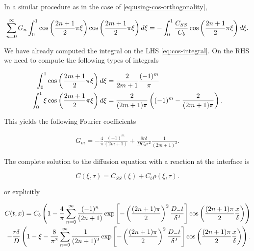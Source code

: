 In a similar procedure as in the case of \ref{eq:using-cos-orthogonality},

\begin{align}
	\sum_{n=0}^{\infty} G_n \int_{0}^{1}\cos\left({\frac{2n+1}{2}\pi\xi}\right)\cos\left({\frac{2m+1}{2}\pi\xi}\right) d\xi = -\int_0^1 \frac{C_{SS}}{C_b}\cos\left({\frac{2n+1}{2}\pi\xi}\right) d\xi.
\end{align}

We have already computed the integral on the LHS \ref{eq:cos-integral}. On the RHS we need to compute the following types of integrals

\begin{align}
	\int_0^1 \cos\left({\frac{2m+1}{2}\pi\xi}\right) d\xi &= \frac{2}{2m+1} \frac{(-1)^m}{\pi}\\
	\int_0^1 \xi \cos\left({\frac{2m+1}{2}\pi\xi}\right) d\xi &= \frac{2}{(2m+1)\pi} \left({(-1)^m -\frac{2}{(2m+1)\pi}}\right).
\end{align}

This yields the following Fourier coefficients

\begin{align}
	G_m = -\frac{4}{\pi}\frac{(-1)^m}{(2m+1)} + \frac{8r\delta}{DC_b\pi^2}\frac{1}{(2m+1)^2}.
\end{align}

The complete solution to the diffusion equation with a reaction at the interface is

$$C(\xi, \tau) = C_{SS}(\xi) + C_b \rho(\xi, \tau).$$

or explicitly

\begin{align}\nonumber
	C(t, x) = C_b\left({1- \frac{4}{\pi} \sum_{n=0}^\infty \frac{(-1)^n}{(2n+1)}\exp\left[{-\left({\frac{(2n+1)\pi}{2}}\right)^2\frac{D_- t}{\delta^2}}\right]\cos\left({\frac{(2n+1)\pi}{2} \frac{x}{\delta}}\right)}\right)\\ -\frac{r\delta}{D}\left({1-\xi - \frac{8}{\pi^2}\sum_{n=0}^\infty \frac{1}{(2n+1)^2}\exp\left[{-\left({\frac{(2n+1)\pi}{2}}\right)^2\frac{D_- t}{\delta^2}}\right]\cos\left({\frac{(2n+1)\pi}{2} \frac{x}{\delta}}\right)}\right).
	\label{eq:solution-diffusion-analytic}
\end{align}

\newpage


